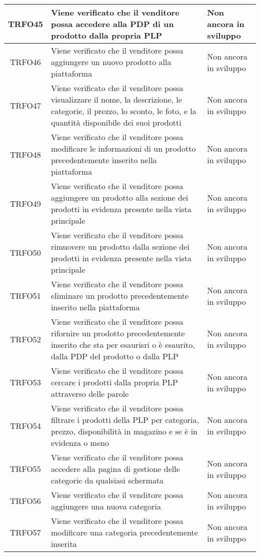 \begin{longtable}{|c| C{10cm} |C{3cm}|}
	TRFO45 & Viene verificato che il venditore possa accedere alla PDP di un prodotto dalla propria PLP & Non ancora in sviluppo\\ \hline
    	TRFO46 & Viene verificato che il venditore possa aggiungere un nuovo prodotto alla piattaforma & Non ancora in sviluppo\\ \hline
    	TRFO47 & Viene verificato che il venditore possa visualizzare il nome, la descrizione, le categorie, il prezzo, lo sconto, le foto, e la quantità disponibile dei suoi prodotti & Non ancora in sviluppo\\ \hline
    	TRFO48 & Viene verificato che il venditore possa modificare le informazioni di un prodotto precedentemente inserito nella piattaforma & Non ancora in sviluppo\\ \hline
    	TRFO49 & Viene verificato che il venditore possa aggiungere un prodotto alla sezione dei prodotti in evidenza presente nella vista principale & Non ancora in sviluppo\\ \hline
    	TRFO50 & Viene verificato che il venditore possa rimuovere un prodotto dalla sezione dei prodotti in evidenza  presente nella vista principale & Non ancora in sviluppo\\ \hline
    	TRFO51 & Viene verificato che il venditore possa eliminare un prodotto precedentemente inserito nella piattaforma & Non ancora in sviluppo\\ \hline
    	TRFO52 & Viene verificato che il venditore possa rifornire un prodotto precedentemente inserito che sta per esaurisri o è esaurito, dalla PDP del prodotto o dalla PLP & Non ancora in sviluppo\\ \hline
   	TRFO53 & Viene verificato che il venditore possa cercare i prodotti dalla propria PLP attraverso delle parole & Non ancora in sviluppo\\ \hline
    	TRFO54 & Viene verificato che il venditore possa filtrare i prodotti della PLP per categoria, prezzo, disponibilità in magazino e se è in evidenza o meno & Non ancora in sviluppo\\ \hline
	TRFO55 & Viene verificato che il venditore possa accedere alla pagina di gestione delle categorie da qualsiasi schermata & Non ancora in sviluppo\\ \hline
    	TRFO56 & Viene verificato che il venditore possa aggiungere una nuova categoria & Non ancora in sviluppo\\ \hline
    	TRFO57 & Viene verificato che il venditore possa modificare una categoria precedentemente inserita & Non ancora in sviluppo\\ \hline

\end{longtable}
